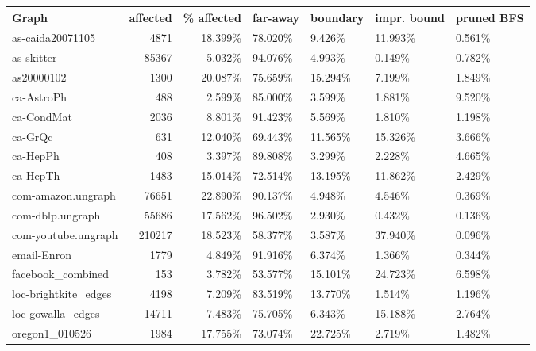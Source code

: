 \begin{table}[h!]
\begin{tabular}{lrrllll}
\toprule
 Graph                &   affected &   \% affected & far-away   & boundary   & impr. bound   & pruned BFS   \\
\midrule \midrule
 as-caida20071105     &       4871 & 18.399\% & 78.020\%    & 9.426\%     & 11.993\%       & 0.561\%   \\
 as-skitter           &      85367 & 5.032\%  & 94.076\%    & 4.993\%     & 0.149\%        & 0.782\%   \\
 as20000102           &       1300 & 20.087\% & 75.659\%    & 15.294\%    & 7.199\%        & 1.849\%   \\
 ca-AstroPh           &        488 & 2.599\%  & 85.000\%    & 3.599\%     & 1.881\%        & 9.520\%   \\
 ca-CondMat           &       2036 & 8.801\%  & 91.423\%    & 5.569\%     & 1.810\%        & 1.198\%   \\
 ca-GrQc              &        631 & 12.040\% & 69.443\%    & 11.565\%    & 15.326\%       & 3.666\%   \\
 ca-HepPh             &        408 & 3.397\%  & 89.808\%    & 3.299\%     & 2.228\%        & 4.665\%   \\
 ca-HepTh             &       1483 & 15.014\% & 72.514\%    & 13.195\%    & 11.862\%       & 2.429\%   \\
 com-amazon.ungraph   &      76651 & 22.890\% & 90.137\%    & 4.948\%     & 4.546\%        & 0.369\%   \\
 com-dblp.ungraph     &      55686 & 17.562\% & 96.502\%    & 2.930\%     & 0.432\%        & 0.136\%   \\
 com-youtube.ungraph  &     210217 & 18.523\% & 58.377\%    & 3.587\%     & 37.940\%       & 0.096\%   \\
 email-Enron          &       1779 & 4.849\%  & 91.916\%    & 6.374\%     & 1.366\%        & 0.344\%   \\
 facebook\_combined    &        153 & 3.782\%  & 53.577\%    & 15.101\%    & 24.723\%       & 6.598\%   \\
 loc-brightkite\_edges &       4198 & 7.209\%  & 83.519\%    & 13.770\%    & 1.514\%        & 1.196\%   \\
 loc-gowalla\_edges    &      14711 & 7.483\%  & 75.705\%    & 6.343\%     & 15.188\%       & 2.764\%   \\
 oregon1\_010526       &       1984 & 17.755\% & 73.074\%    & 22.725\%    & 2.719\%        & 1.482\%   \\

\end{tabular}
\end{table}
